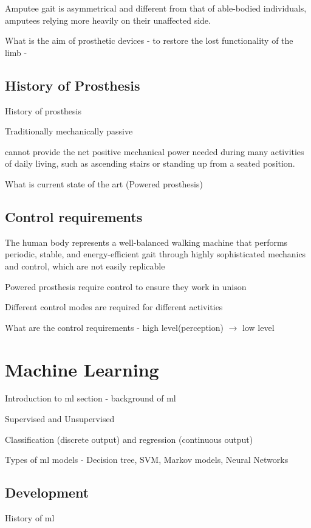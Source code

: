 Amputee gait is asymmetrical and different from that of able-bodied individuals, amputees relying more heavily on their unaffected side.\cite{Bateni2002, Varrecchia2019}

What is the aim of prosthetic devices - to restore the lost functionality of the limb - \cite{Tucker2015}

\subsection{History of Prosthesis}
History of prosthesis

Traditionally mechanically passive

cannot provide the net positive mechanical power needed during many activities of daily living, such as ascending stairs or standing up from a seated position\cite{Simon2013}.

What is current state of the art (Powered prosthesis)


\subsection{Control requirements} %
The human body represents a well-balanced walking machine that performs periodic, stable, and energy-efficient gait through highly sophisticated mechanics and control, which are not easily replicable\cite{Mummolo2013}

Powered prosthesis require control to ensure they work in unison

Different control modes are required for different activities\cite{Simon2013}

What are the control requirements - high level(perception) $\rightarrow$ low level\cite{Tucker2015}


\section{Machine Learning}
Introduction to \acrfull{ml} section - background of \acrshort{ml}

Supervised and Unsupervised

Classification (discrete output) and regression (continuous output)

Types of ml models - Decision tree, SVM, Markov models, Neural Networks

\subsection{Development}
History of \acrshort{ml}


